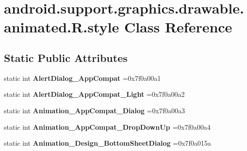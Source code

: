 \hypertarget{classandroid_1_1support_1_1graphics_1_1drawable_1_1animated_1_1R_1_1style}{}\section{android.\+support.\+graphics.\+drawable.\+animated.\+R.\+style Class Reference}
\label{classandroid_1_1support_1_1graphics_1_1drawable_1_1animated_1_1R_1_1style}
\subsection*{Static Public Attributes}
\begin{DoxyCompactItemize}
\item 
\mbox{\label{classandroid_1_1support_1_1graphics_1_1drawable_1_1animated_1_1R_1_1style_a4ff27dd08995853a754dc7a8df61a503}} 
static int {\bfseries Alert\+Dialog\+\_\+\+App\+Compat} =0x7f0a00a1
\item 
\mbox{\label{classandroid_1_1support_1_1graphics_1_1drawable_1_1animated_1_1R_1_1style_a82835772c4b4bbbaaf82e5e72f709dd2}} 
static int {\bfseries Alert\+Dialog\+\_\+\+App\+Compat\+\_\+\+Light} =0x7f0a00a2
\item 
\mbox{\label{classandroid_1_1support_1_1graphics_1_1drawable_1_1animated_1_1R_1_1style_a126eb39d6dd9a528eadd6edca5108ea8}} 
static int {\bfseries Animation\+\_\+\+App\+Compat\+\_\+\+Dialog} =0x7f0a00a3
\item 
\mbox{\label{classandroid_1_1support_1_1graphics_1_1drawable_1_1animated_1_1R_1_1style_a3b32a5f38dd2f42829045b7011023686}} 
static int {\bfseries Animation\+\_\+\+App\+Compat\+\_\+\+Drop\+Down\+Up} =0x7f0a00a4
\item 
\mbox{\label{classandroid_1_1support_1_1graphics_1_1drawable_1_1animated_1_1R_1_1style_aa12e3b913a6d628a8e857f71543f568e}} 
static int {\bfseries Animation\+\_\+\+Design\+\_\+\+Bottom\+Sheet\+Dialog} =0x7f0a015a

\end{DoxyCompactItemize}
